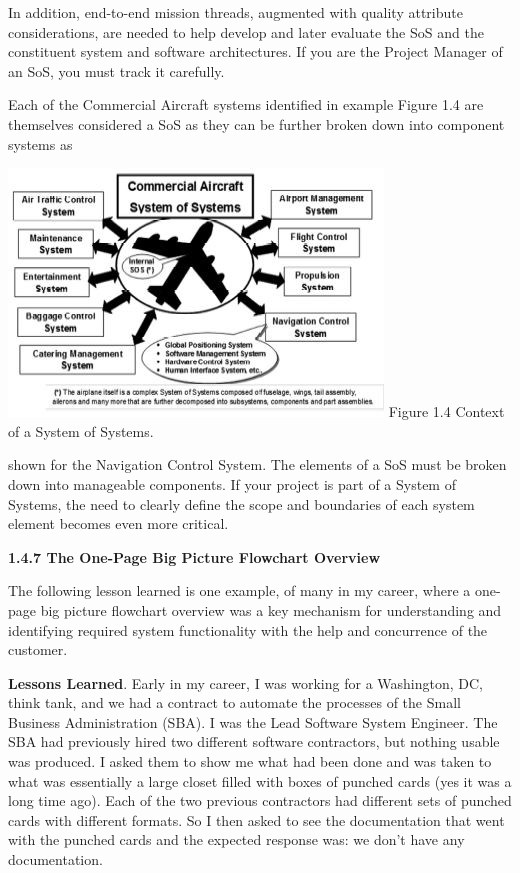 \documentclass{book}
\begin{document}
\begin{multicols}{2}
In addition, end-to-end mission threads, augmented with
quality attribute considerations, are needed to help develop
and later evaluate the SoS and the constituent system and
software architectures. If you are the Project Manager of an
SoS, you must track it carefully.

Each of the Commercial Aircraft systems identified in
example Figure 1.4 are themselves considered a SoS as they
can be further broken down into component systems as 

\includegraphics{Figure1.4}
Figure 1.4 Context of a System of Systems.

shown for the Navigation Control System. The elements of
a SoS must be broken down into manageable components.
If your project is part of a System of Systems, the need to
clearly define the scope and boundaries of each system element
becomes even more critical.


\textbf{1.4.7 The One-Page Big Picture Flowchart Overview}


The following lesson learned is one example, of many in my
career, where a one-page big picture flowchart overview was
a key mechanism for understanding and identifying required
system functionality with the help and concurrence of the
customer.

\textbf{Lessons Learned}. Early in my career, I was
working for a Washington, DC, think tank,
and we had a contract to automate the processes
of the Small Business Administration (SBA).
I was the Lead Software System Engineer. The
SBA had previously hired two different software
contractors, but nothing usable was produced.
I asked them to show me what had been done
and was taken to what was essentially a large
closet filled with boxes of punched cards (yes it
was a long time ago). Each of the two previous
contractors had different sets of punched cards
with different formats. So I then asked to see
the documentation that went with the punched
cards and the expected response was: we don’t
have any documentation.


\end{multicols}
\end{document}
